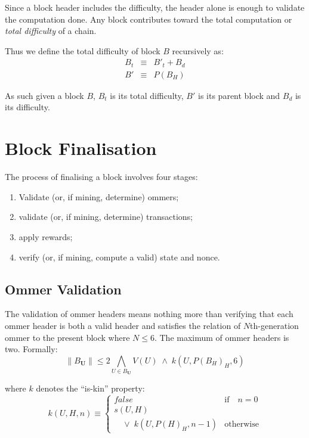 \documentclass[9pt,oneside]{amsart}
\begin{document}
\begin{multicols}{2}
Since a block header includes the difficulty, the header alone is enough to validate the computation done. Any block contributes toward the total computation or \textit{total difficulty} of a chain.

Thus we define the total difficulty of block $B$ recursively as:
\begin{eqnarray}
B_t & \equiv & B'_t + B_d \\
B' & \equiv & P(B_H)
\end{eqnarray}

As such given a block $B$, $B_t$ is its total difficulty, $B'$ is its parent block and $B_d$ is its difficulty.

\section{Block Finalisation} \label{ch:finalisation}

The process of finalising a block involves four stages:

\begin{enumerate}
\item Validate (or, if mining, determine) ommers;
\item validate (or, if mining, determine) transactions;
\item apply rewards;
\item verify (or, if mining, compute a valid) state and nonce.
\end{enumerate}

\subsection{Ommer Validation}

The validation of ommer headers means nothing more than verifying that each ommer header is both a valid header and satisfies the relation of $N$th-generation ommer to the present block where $N \leq 6$. The maximum of ommer headers is two. Formally:
\begin{equation}
\lVert B_\mathbf{U} \rVert \leqslant 2 \bigwedge_{U \in B_\mathbf{U}} V(U) \; \wedge \; k(U, P(B_H)_H, 6)
\end{equation}

where $k$ denotes the ``is-kin'' property:
\begin{equation}
k(U, H, n) \equiv \begin{cases} false & \text{if} \quad n = 0 \\
s(U, H) &\\
\quad \vee \; k(U, P(H)_H, n - 1) & \text{otherwise}
\end{cases}
\end{equation}


\end{multicols}
\end{document}
